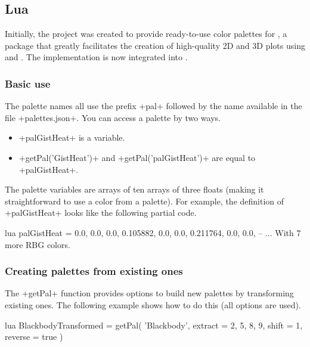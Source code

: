 \documentclass{tutodoc}
\begin{document}

\subsection{Lua}
\label{products-lua}

\begin{tdocnote}
Initially, the {\thisproj} project was created to provide ready-to-use color palettes for {\LUADRAW}, a package that greatly facilitates the creation of high-quality 2D and 3D plots using {\LuaLaTeX} and {\TIKZ}. The {\lua} implementation is now integrated into {\LUADRAW}.
\end{tdocnote}

\subsubsection{Basic use}

The {\lua} palette names all use the prefix +pal+ followed by the name available in the file +palettes.json+. You can access a palette by two ways.

\begin{itemize}
\item
{}+palGistHeat+ is a {\lua} variable.

\item
{}+getPal('GistHeat')+ and +getPal('palGistHeat')+ are equal to +palGistHeat+.
\end{itemize}

The {\lua} palette variables are arrays of ten arrays of three floats (making it straightforward to use a color from a palette). For example, the definition of +palGistHeat+ looks like the following partial code.

\begin{tdoccode}{lua}
palGistHeat = {
    {0.0, 0.0, 0.0},
    {0.105882, 0.0, 0.0},
    {0.211764, 0.0, 0.0},
    -- ... With 7 more RBG colors.
}
\end{tdoccode}

\subsubsection{Creating palettes from existing ones}

The +getPal+ function provides options to build new palettes by transforming existing ones. The following example shows how to do this (all options are used).

\begin{tdoccode}{lua}
BlackbodyTransformed = getPal(
    'Blackbody',
    {
        extract = {2, 5, 8, 9},
        shift   = 1,
        reverse = true
    }
)
\end{tdoccode}

\end{document}
